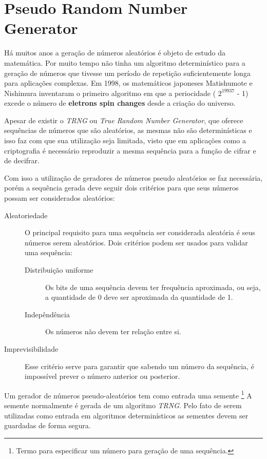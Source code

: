 \chapter{Pseudo Random Number Generator}
\label{pseudo-random-number-generator}

% 
Há muitos anos a geração de números aleatórios é objeto de estudo da matemática. Por muito tempo não tinha um algoritmo determinístico para a geração de números que tivesse um período de repetição suficientemente longa para aplicações complexas. Em 1998, os matemáticos japoneses Matishumote e Nishimura inventaram o primeiro algoritmo em que a periocidade ( $2 ^ {19937}$ - 1) excede o número de \textbf{eletrons spin changes} desde a criação do universo. ~\cite{cristophe-diethelm} 

%
Apesar de existir o \textit{TRNG} ou \textit{True Random Number Generator}, que oferece sequências de números que são aleatórios, as mesmas não são determinísticas e isso faz com que sua utilização seja limitada, visto que em aplicações como a criptografia é necessário reproduzir a mesma sequência para a função de cifrar e de decifrar. 

%
Com isso a utilização de geradores de números pseudo aleatórios se faz necessária, porém a sequência gerada deve seguir dois critérios para que seus números possam ser considerados aleatórios:

\begin{description}
	\item [Aleatoriedade]
	O principal requisito para uma sequência ser considerada aleatória é seus números serem aleatórios. Dois critérios podem ser usados para validar uma sequência:
		\begin{description}
			\item [Distribuição uniforme]
			Os bits de uma sequência devem ter frequência aproximada, ou seja, a quantidade de 0 deve ser aproximada da quantidade de 1.
			\item [Indepêndência]
			Os números não devem ter relação entre si.
			
		\end{description}
	\item [Imprevisibilidade]
	Esse critério serve para garantir que sabendo um número da sequência, é impossível prever o número anterior ou posterior.
\end{description}

Um gerador de números pseudo-aleatórios tem como entrada uma semente \footnote{Termo para especificar um número para geração de uma sequência.} A semente normalmente é gerada de um algoritmo \textit{TRNG}. Pelo fato de serem utilizadas como entrada em algoritmos determinísticos as sementes devem ser guardadas de forma segura.

